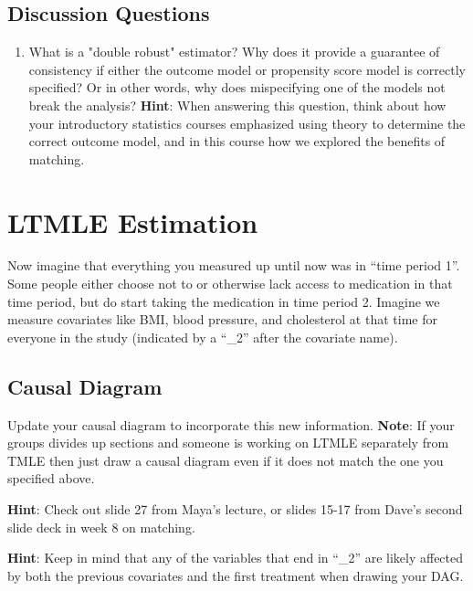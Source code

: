 \documentclass[
]{article}
\begin{document}
\hypertarget{discussion-questions-1}{%
\subsection{Discussion Questions}\label{discussion-questions-1}}

\begin{enumerate}
    \item What is a "double robust" estimator? Why does it provide a guarantee of consistency if either the outcome model or propensity score model is correctly specified? Or in other words, why does mispecifying one of the models not break the analysis? \textbf{Hint}: When answering this question, think about how your introductory statistics courses emphasized using theory to determine the correct outcome model, and in this course how we explored the benefits of matching.
\end{enumerate}

\hypertarget{ltmle-estimation}{%
\section{LTMLE Estimation}\label{ltmle-estimation}}

Now imagine that everything you measured up until now was in ``time
period 1''. Some people either choose not to or otherwise lack access to
medication in that time period, but do start taking the medication in
time period 2. Imagine we measure covariates like BMI, blood pressure,
and cholesterol at that time for everyone in the study (indicated by a
``\_2'' after the covariate name).

\hypertarget{causal-diagram-1}{%
\subsection{Causal Diagram}\label{causal-diagram-1}}

Update your causal diagram to incorporate this new information.
\textbf{Note}: If your groups divides up sections and someone is working
on LTMLE separately from TMLE then just draw a causal diagram even if it
does not match the one you specified above.

\textbf{Hint}: Check out slide 27 from Maya's lecture, or slides 15-17
from Dave's second slide deck in week 8 on matching.

\textbf{Hint}: Keep in mind that any of the variables that end in
``\_2'' are likely affected by both the previous covariates and the
first treatment when drawing your DAG.
\end{document}
